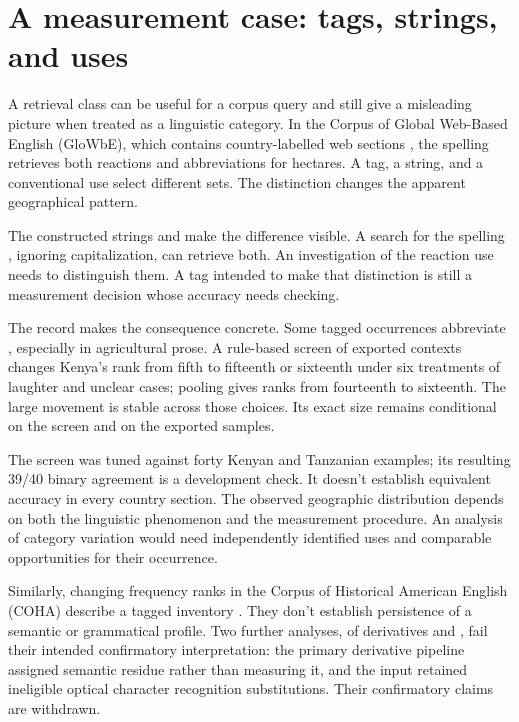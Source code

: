 \documentclass[12pt]{article}
\begin{document}
\section{A measurement case: tags, strings, and uses}\label{sec:evidence}

A retrieval class can be useful for a corpus query and still give
a misleading picture when treated as a linguistic category. In the
Corpus of Global Web-Based English (GloWbE), which contains country-labelled
web sections \citep{daviesfuchs2015}, the spelling  retrieves
both reactions and abbreviations for hectares. A tag, a string, and
a conventional use select different sets. The distinction changes the
apparent geographical pattern.

The constructed strings  and  make the difference visible. A search for the spelling
, ignoring capitalization, can retrieve both. An investigation
of the reaction use needs to distinguish them. A tag intended to
make that distinction is still a measurement decision whose accuracy
needs checking.

The  record makes the consequence concrete. Some tagged
occurrences abbreviate , especially in agricultural prose.
A rule-based screen of exported contexts changes Kenya's rank from fifth
to fifteenth or sixteenth under six treatments of laughter and unclear
cases; pooling gives ranks from fourteenth to sixteenth. The large
movement is stable across those choices. Its exact size remains
conditional on the screen and on the exported samples.

The screen was tuned against forty Kenyan and Tanzanian examples;
its resulting 39/40 binary agreement is a development check. It doesn't
establish equivalent accuracy in every country section. The observed
geographic distribution depends on both the linguistic
phenomenon and the measurement procedure. An analysis of category
variation would need independently identified uses and comparable
opportunities for their occurrence.

Similarly, changing frequency ranks in the Corpus of Historical American
English (COHA) describe a tagged inventory \citep{davies2010}.
They don't establish persistence of a semantic or grammatical profile.
Two further analyses, of derivatives and , fail their
intended confirmatory interpretation: the primary derivative pipeline
assigned semantic residue rather than measuring it, and the 
input retained ineligible optical character recognition substitutions.
Their confirmatory claims are withdrawn.
\end{document}
